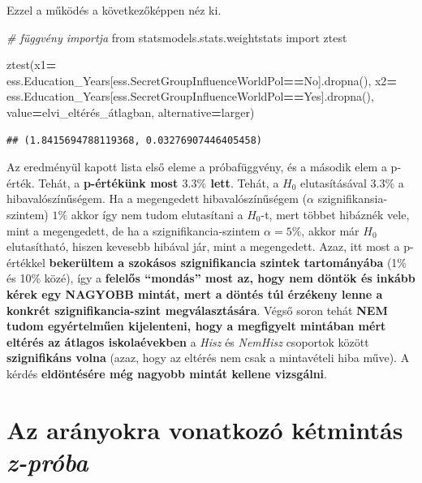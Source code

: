 \documentclass[
]{book}
\newenvironment{Shaded}{\begin{snugshade}}{\end{snugshade}}
\newcommand{\CommentTok}[1]{\textcolor[rgb]{0.56,0.35,0.01}{\textit{#1}}}
\newcommand{\ImportTok}[1]{#1}
\newcommand{\NormalTok}[1]{#1}
\newcommand{\OperatorTok}[1]{\textcolor[rgb]{0.81,0.36,0.00}{\textbf{#1}}}
\newcommand{\StringTok}[1]{\textcolor[rgb]{0.31,0.60,0.02}{#1}}
\begin{document}
Ezzel a működés a következőképpen néz ki.

\begin{Shaded}
\begin{Highlighting}[]
\CommentTok{\# függvény importja}
\ImportTok{from}\NormalTok{ statsmodels.stats.weightstats }\ImportTok{import}\NormalTok{ ztest}

\NormalTok{ztest(x1}\OperatorTok{=}\NormalTok{ ess.Education\_Years[ess.SecretGroupInfluenceWorldPol}\OperatorTok{==}\StringTok{\textquotesingle{}No\textquotesingle{}}\NormalTok{].dropna(),}
\NormalTok{      x2}\OperatorTok{=}\NormalTok{ ess.Education\_Years[ess.SecretGroupInfluenceWorldPol}\OperatorTok{==}\StringTok{\textquotesingle{}Yes\textquotesingle{}}\NormalTok{].dropna(),}
\NormalTok{      value}\OperatorTok{=}\NormalTok{elvi\_eltérés\_átlagban,}
\NormalTok{      alternative}\OperatorTok{=}\StringTok{\textquotesingle{}larger\textquotesingle{}}\NormalTok{)}
\end{Highlighting}
\end{Shaded}

\begin{verbatim}
## (1.8415694788119368, 0.03276907446405458)
\end{verbatim}

Az eredményül kapott lista első eleme a próbafüggvény, és a második elem a p-érték. Tehát, a \textbf{p-értékünk most \(3.3\%\) lett}. Tehát, a \(H_0\) elutasításával \(3.3\%\) a hibavalószínűségem. Ha a megengedett hibavalószínűségem (\(\alpha\) szignifikansia-szintem) \(1\%\) akkor így nem tudom elutasítani a \(H_0\)-t, mert többet hibáznék vele, mint a megengedett, de ha a szignifikancia-szintem \(\alpha = 5\%\), akkor már \(H_0\) elutasítható, hiszen kevesebb hibával jár, mint a megengedett.
Azaz, itt most a p-értékkel \textbf{bekerültem a szokásos szignifikancia szintek tartományába} (1\% és 10\% közé), így a \textbf{felelős ``mondás'' most az, hogy nem döntök és inkább kérek egy NAGYOBB mintát, mert a döntés túl érzékeny lenne a konkrét szignifikancia-szint megválasztására}.
Végső soron tehát \textbf{NEM tudom egyértelműen kijelenteni, hogy a megfigyelt mintában mért eltérés az átlagos iskolaévekben} a \emph{Hisz} és \emph{NemHisz} csoportok között \textbf{szignifikáns volna} (azaz, hogy az eltérés nem csak a mintavételi hiba műve). A kérdés \textbf{eldöntésére még nagyobb mintát kellene vizsgálni}.

\section{\texorpdfstring{Az arányokra vonatkozó kétmintás \emph{z-próba}}{Az arányokra vonatkozó kétmintás z-próba}}\label{az-aruxe1nyokra-vonatkozuxf3-kuxe9tmintuxe1s-z-pruxf3ba}
\end{document}
